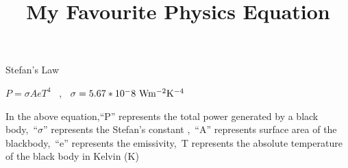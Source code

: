 \documentclass[a3paper,12pt]{article}
\title{My Favourite Physics Equation}
\begin{document}
\maketitle
\begin{center}
\large Stefan's Law
\end{center}
\vspace{5mm}
\large $P=\sigma A e { T^4}$ ~,~ $ \sigma=5.67*10^-8~\rm{Wm^{-2}K^{-4}}$

\vspace{5mm}
\begin{flushleft}
In the above equation,``P'' represents the total power generated by a black body,~``$\sigma$'' represents the Stefan's constant ,~``A'' represents surface area of the blackbody,~``e'' represents the emissivity,~T represents the absolute temperature of the black body in Kelvin (K)
\end{flushleft}
\end{document}
